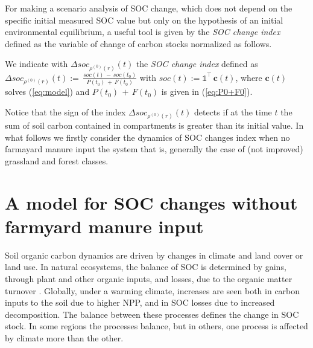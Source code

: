 \bigskip
 \noindent For making a scenario analysis of  SOC change, which does not depend on the specific initial measured SOC value but only on the hypothesis of an initial environmental equilibrium, a useful tool is given by the {\it SOC change index} defined as the variable of change of carbon stocks normalized as follows.

\begin{definition}\label{def:delta_SOC}
We indicate with $\Delta soc_{\rho^{(0)}(r)}(t)$ the  {\it SOC change index} defined as 
$\Delta soc_{\rho^{(0)}(r)}(t):=\, \displaystyle \frac{soc(t)\, -\, soc(t_0)}{P(t_0)\,+\, F(t_0)}$
with $soc(t):= \mathds{1}^\intercal  \, \mathbf{c}(t)$, where $\mathbf{c}(t)$ solves  (\ref{eq:model}) and $P(t_0)\,+\, F(t_0)$ is given in (\ref{eq:P0+F0}).
\end{definition} 
 
 \noindent Notice that the sign of the index $\Delta soc_{\rho^{(0)}(r)}(t)$  detects if at the time $t$ the sum of  soil carbon contained in  compartments is greater than its initial value. 
 In what follows we firstly consider  the dynamics of SOC changes index when no farmayard manure input the system that is, generally the case of (not improved) grassland and forest classes.

\section{A model for SOC changes without farmyard manure input}\label{sec:4}
Soil organic carbon dynamics are driven by changes in climate and land cover or land use. In natural ecosystems, the balance of SOC is determined by gains, through plant and other organic inputs, and losses, due to the organic matter turnover \cite{smith2005projected}.
Globally, under a warming climate, increases are seen both in carbon inputs to the soil due to higher NPP, and in SOC losses due to increased decomposition. The balance between these processes defines the change in SOC stock. In some regions the processes balance, but in others, one process is affected by climate more than the other. 


